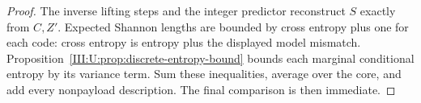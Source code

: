 \begin{proof}
The inverse lifting steps and the integer predictor reconstruct $S$
exactly from $C,Z'$. Expected Shannon lengths are bounded by cross
entropy plus one for each code: cross entropy is entropy plus the
displayed model mismatch. Proposition~\ref{III:U:prop:discrete-entropy-bound}
bounds each marginal conditional entropy by its variance term.
Sum these inequalities, average over the core, and add every
nonpayload description. The final comparison is then immediate.
\end{proof}
